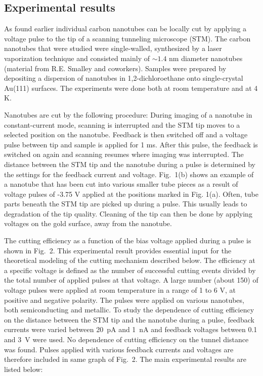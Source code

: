 \begin{multicols}{2}
\section{Experimental results}

As found earlier \cite{Venema} individual carbon nanotubes can be
locally cut by applying a voltage pulse to the tip of a scanning
tunneling microscope (STM). The carbon nanotubes that were studied
were single-walled, synthesized by a laser vaporization technique
and consisted mainly of $\sim 1.4$ nm diameter nanotubes (material
from R.E. Smalley and coworkers)\cite{Smalley}. Samples were
prepared by depositing a dispersion of nanotubes in
1,2-dichloroethane onto single-crystal Au(111) surfaces. The
experiments were done both at room temperature and at 4 K.

Nanotubes are cut by the following procedure: During imaging of a
nanotube in constant-current mode, scanning is interrupted and the
STM tip moves to a selected position on the nanotube. Feedback is
then switched off and a voltage pulse between tip and sample is
applied for 1 ms. After this pulse, the feedback is switched on
again and scanning resumes where imaging was interrupted. The
distance between the STM tip and the nanotube during a pulse is
determined by the settings for the feedback current and voltage.
Fig.~1(b) shows an example of a nanotube that has been cut into
various smaller tube pieces as a result of voltage pulses of -3.75
V applied at the positions marked in Fig. 1(a). Often, tube parts
beneath the STM tip are picked up during a pulse. This usually
leads to degradation of the tip quality. Cleaning of the tip can
then be done by applying voltages on the gold surface, away from
the nanotube.


The cutting efficiency as a function of the bias voltage applied
during a pulse is shown in Fig.~2. This experimental result
provides essential input for the theoretical modeling of the
cutting mechanism described below. The efficiency at a specific
voltage is defined as the number of successful cutting events
divided by the total number of applied pulses at that voltage. A
large number (about 150) of voltage pulses were applied at room
temperature in a range of 1 to 6 V, at positive and negative
polarity. The pulses were applied on various nanotubes, both
semiconducting and metallic. To study the dependence of cutting
efficiency on the distance between the STM tip and the nanotube
during a pulse, feedback currents were varied between 20~pA and
1~nA and feedback voltages between 0.1 and 3~V were used. No
dependence of cutting efficiency on the tunnel distance was found.
Pulses applied with various feedback currents and voltages are
therefore included in same graph of Fig.~2. The main experimental
results are listed below:


\end{multicols}
